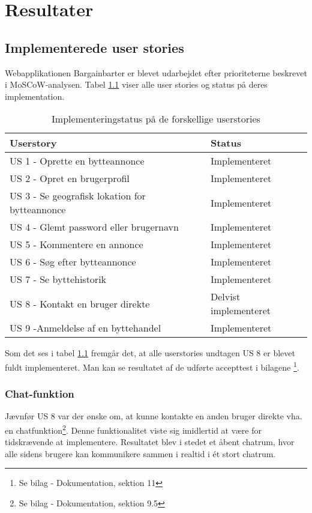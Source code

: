 \chapter{Resultater}\label{ch:Resultat og Diskussion}
\section{Implementerede user stories}
Webapplikationen Bargainbarter er blevet udarbejdet efter prioriteterne beskrevet i MoSCoW-analysen. Tabel \ref{fig:Implementeringsstatus} viser alle user stories og status på deres implementation.

\begin{table}[H]
	\begin{tabular}{ | l | p{5cm} |}
		\hline
		\textbf{Userstory}  & \textbf{Status} \\ \hline
		US 1 - Oprette en bytteannonce  & Implementeret \\ \hline
		US 2 - Opret en brugerprofil & Implementeret \\ \hline
		US 3 - Se geografisk lokation for bytteannonce & Implementeret \\ \hline
		US 4 - Glemt password eller brugernavn & Implementeret \\ \hline
		US 5 - Kommentere en annonce & Implementeret \\ \hline
		US 6 - Søg efter bytteannonce & Implementeret \\ \hline
		US 7 - Se byttehistorik & Implementeret \\ \hline	
		US 8 - Kontakt en bruger direkte & Delvist implementeret \\ \hline	
		US 9 -Anmeldelse af en byttehandel & Implementeret \\ \hline	
	\end{tabular}
\caption{Implementeringstatus på de forskellige userstories}
\label{fig:Implementeringsstatus}
\end{table}

Som det ses i tabel \ref{fig:Implementeringsstatus} fremgår det, at alle userstories undtagen  US 8 er blevet fuldt implementeret. Man kan se resultatet af de udførte accepttest i bilagene \footnote{Se bilag - Dokumentation, sektion 11}.

\subsection{Chat-funktion}
Jævnfør US 8 var der ønske om, at kunne kontakte en anden bruger direkte vha. en chatfunktion\footnote{Se bilag - Dokumentation, sektion 9.5}. Denne funktionalitet viste sig imidlertid at være for tidskrævende at implementere. Resultatet blev i stedet et åbent chatrum, hvor alle sidens brugere kan kommunikere sammen i realtid i ét stort chatrum. 

